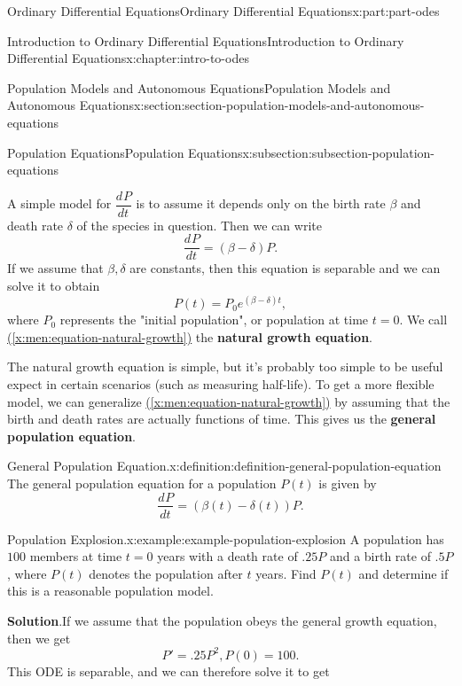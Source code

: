 \documentclass[twoside,10pt,]{book}
\newcommand{\blocktitlefont}{\relax}
\newcommand{\xreffont}{\relax}
\newcommand{\terminology}[1]{\textbf{#1}}
\numberwithin{equation}{part}
\providecommand{\dv}[3][]{\dfrac{d^{#1} #2}{d #3^{#1}}}
\begin{document}
\begin{partptx}{Ordinary Differential Equations}{}{Ordinary Differential Equations}{}{}{x:part:part-odes}
\begin{chapterptx}{Introduction to Ordinary Differential Equations}{}{Introduction to Ordinary Differential Equations}{}{}{x:chapter:intro-to-odes}
\begin{sectionptx}{Population Models and Autonomous Equations}{}{Population Models and Autonomous Equations}{}{}{x:section:section-population-models-and-autonomous-equations}
\begin{subsectionptx}{Population Equations}{}{Population Equations}{}{}{x:subsection:subsection-population-equations}
\par
A simple model for \(\dv{P}{t}\) is to assume it depends only on the birth rate \(\beta\) and death rate \(\delta\) of the species in question. Then we can write%
\begin{equation}
\dv{P}{t} = (\beta - \delta)P.\label{x:men:equation-natural-growth}
\end{equation}
If we assume that \(\beta,\delta\) are constants, then this equation is separable and we can solve it to obtain%
\begin{equation*}
P(t) = P_{0}e^{(\beta - \delta)t},
\end{equation*}
where \(P_{0}\) represents the "initial population", or population at time \(t = 0\). We call \hyperref[x:men:equation-natural-growth]{({\xreffont\ref{x:men:equation-natural-growth}})} the \terminology{natural growth equation}.%
\par
The natural growth equation is simple, but it's probably too simple to be useful expect in certain scenarios (such as measuring half-life). To get a more flexible model, we can generalize \hyperref[x:men:equation-natural-growth]{({\xreffont\ref{x:men:equation-natural-growth}})} by assuming that the birth and death rates are actually functions of time. This gives us the \terminology{general population equation}.%
\begin{definition}{General Population Equation.}{x:definition:definition-general-population-equation}%
The general population equation for a population \(P(t)\) is given by%
\begin{equation*}
\dv{P}{t} = (\beta(t) - \delta(t))P.
\end{equation*}
%
\end{definition}
\begin{example}{Population Explosion.}{x:example:example-population-explosion}%
A population has \(100\) members at time \(t = 0\) years with a death rate of \(.25P\) and a birth rate of \(.5P\), where \(P(t)\) denotes the population after \(t\) years. Find \(P(t)\) and determine if this is a reasonable population model.%
\par\smallskip%
\noindent\textbf{\blocktitlefont Solution}.\hypertarget{g:solution:idp105548816498848}{}\quad{}If we assume that the population obeys the general growth equation, then we get%
\begin{equation*}
P' = .25P^{2}, P(0) = 100.
\end{equation*}
This ODE is separable, and we can therefore solve it to get%
\begin{equation*}

\end{equation*}
\end{example}
\end{subsectionptx}
\end{sectionptx}
\end{chapterptx}
\end{partptx}
\end{document}
